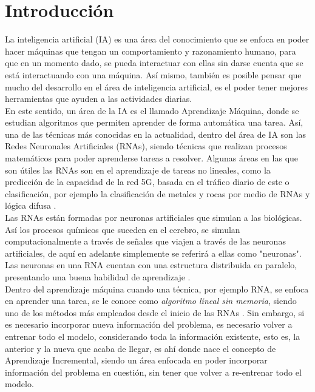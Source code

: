 \section{Introducción}

	
    La inteligencia artificial (IA) es una área del conocimiento que se enfoca en poder hacer máquinas 
    que tengan un comportamiento y razonamiento humano, para que en un momento dado, se pueda interactuar con 
    ellas sin darse cuenta que se est\'a interactuando con una máquina. Así mismo, también es posible 
    pensar que mucho del desarrollo en el área de inteligencia artificial, es el poder tener 
    mejores herramientas que ayuden a las actividades diarias.\\

    En este sentido, un área de la IA es el llamado Aprendizaje Máquina, donde se estudian algoritmos
    que permiten aprender de forma automática una tarea. Así, una de las técnicas más conocidas en la 
    actualidad, dentro del área de IA son las Redes Neuronales Artificiales (RNAs), siendo técnicas que 
    realizan procesos matemáticos para poder aprenderse tareas a resolver. Algunas áreas en las que
    son útiles las RNAs son en el aprendizaje de tareas no lineales, como la predicción de
    la capacidad de la red 5G, basada en el tráfico diario de este \cite{zhao2022} o clasificación, por ejemplo 
    la clasificación de metales y rocas por medio de RNAs y lógica difusa \cite{salazar2013}.\\

    Las RNAs están formadas por neuronas artificiales que simulan a las biológicas. Así los procesos
    químicos que suceden en el cerebro, se simulan computacionalmente a través de señales que viajen
    a través de las neuronas artificiales, de aquí en adelante simplemente se referirá a ellas como 
    "neuronas". Las neuronas en una RNA cuentan con una estructura distribuida en paralelo, presentando 
    una buena habilidad de aprendizaje \cite{liu2015}.\\

    Dentro del aprendizaje máquina cuando una técnica, por ejemplo RNA, se enfoca en aprender una tarea, se le 
    conoce como \textit{algoritmo lineal sin memoria}, siendo uno de los métodos más empleados desde el
    inicio de las RNAs \cite{GiraudCarrier2000}. Sin embargo, si es necesario incorporar nueva
    información del problema,  es necesario volver a entrenar todo el modelo, considerando toda 
    la información existente, esto es, la anterior y la nueva que acaba de llegar, es ahí donde nace el
    concepto de Aprendizaje Incremental, siendo un área enfocada en poder incorporar información 
    del problema en cuestión, sin tener que volver a re-entrenar todo el modelo.\\

